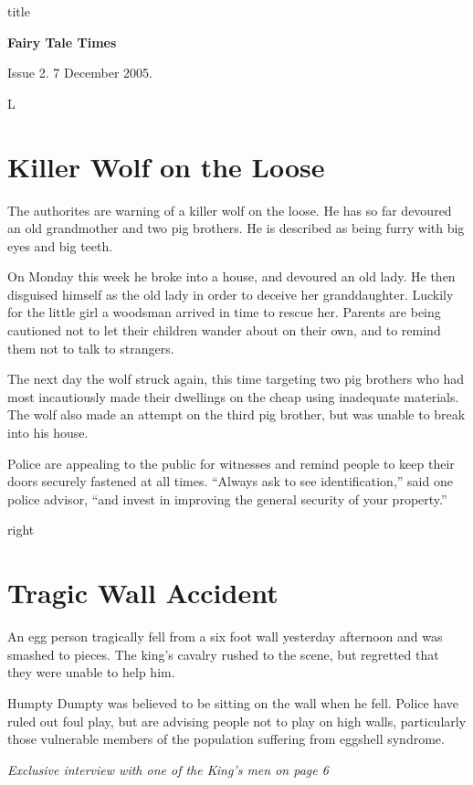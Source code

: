 \documentclass[12pt]{article}
\begin{document}
\begin{staticcontents*}{title}
\begin{center}
\bfseries\Huge
Fairy Tale Times
\end{center}
\hfill Issue 2. 7 December 2005.
\end{staticcontents*}

\begin{staticcontents*}{L}
\section{Killer Wolf on the Loose}
                                                          
The authorites are warning of a killer wolf on the
loose. He has so far devoured an old grandmother and
two pig brothers. He is described as being furry with
big eyes and big teeth.
                                                          
On Monday this week he broke into a house, and devoured
an old lady. He then disguised himself as the old lady
in order to deceive her granddaughter. Luckily for the little
girl a woodsman arrived in time to rescue her. Parents are
being cautioned not to let their children wander about on
their own, and to remind them not to talk to strangers.

The next day the wolf struck again, this time targeting two
pig brothers who had most incautiously made their dwellings
on the cheap using inadequate materials. The wolf also made
an attempt on the third pig brother, but was unable to break
into his house.
                                                          
Police are appealing to the public for witnesses and remind
people to keep their doors securely fastened at all times.                                                          
``Always ask to see identification,'' said one police advisor,
``and invest in improving the general security of your property.''
\end{staticcontents*}

\begin{staticcontents*}{right}
\section{Tragic Wall Accident}

An egg person tragically fell from a six foot wall yesterday
afternoon and was smash\-ed to pieces. The king's cavalry rushed
to the scene, but regretted that they  were unable to help him.

Humpty Dumpty was believed to be sitting on the wall when he fell. Police have ruled out foul play, but
are advising people not to play on high walls, particularly
those vulnerable members of the population suffering from
eggshell syndrome.

\small\em
%
Exclusive interview with one of the King's men on page 6
\end{staticcontents*}
\end{document}
